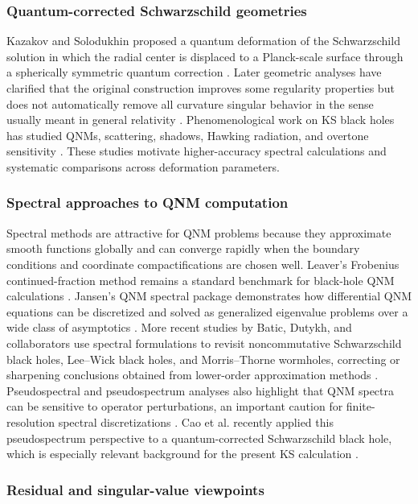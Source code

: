 ﻿\documentclass[12pt,a4paper]{article}
\begin{document}
\subsubsection{Quantum-corrected Schwarzschild geometries}

Kazakov and Solodukhin proposed a quantum deformation of the Schwarzschild solution in which the radial center is displaced to a Planck-scale surface through a spherically symmetric quantum correction \cite{Kazakov1994}. Later geometric analyses have clarified that the original construction improves some regularity properties but does not automatically remove all curvature singular behavior in the sense usually meant in general relativity \cite{Berry2021}. Phenomenological work on KS black holes has studied QNMs, scattering, shadows, Hawking radiation, and overtone sensitivity \cite{Konoplya2020,Bolokhov2025}. These studies motivate higher-accuracy spectral calculations and systematic comparisons across deformation parameters.

\subsubsection{Spectral approaches to QNM computation}

Spectral methods are attractive for QNM problems because they approximate smooth functions globally and can converge rapidly when the boundary conditions and coordinate compactifications are chosen well. Leaver's Frobenius continued-fraction method remains a standard benchmark for black-hole QNM calculations \cite{Leaver1985}. Jansen's QNM spectral package demonstrates how differential QNM equations can be discretized and solved as generalized eigenvalue problems over a wide class of asymptotics \cite{Jansen2017}. More recent studies by Batic, Dutykh, and collaborators use spectral formulations to revisit noncommutative Schwarzschild black holes, Lee--Wick black holes, and Morris--Thorne wormholes, correcting or sharpening conclusions obtained from lower-order approximation methods \cite{Batic2024Noncomm,Batic2024LeeWick,Batic2024Wormhole}. Pseudospectral and pseudospectrum analyses also highlight that QNM spectra can be sensitive to operator perturbations, an important caution for finite-resolution spectral discretizations \cite{Jaramillo2021}. Cao et al. recently applied this pseudospectrum perspective to a quantum-corrected Schwarzschild black hole, which is especially relevant background for the present KS calculation \cite{Cao2024}.

\subsubsection{Residual and singular-value viewpoints}
\end{document}
